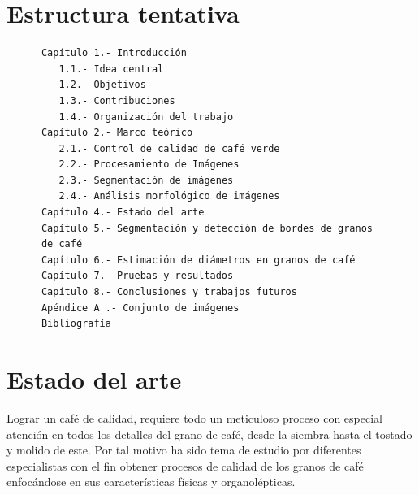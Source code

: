 \documentclass[12pt,a4paper,oneside]{book}
\begin{document}
\section{Estructura tentativa}
\begin{center}
\begin{verbatim}
      Capítulo 1.- Introducción
         1.1.- Idea central
         1.2.- Objetivos
         1.3.- Contribuciones
         1.4.- Organización del trabajo
      Capítulo 2.- Marco teórico
         2.1.- Control de calidad de café verde
         2.2.- Procesamiento de Imágenes
         2.3.- Segmentación de imágenes
         2.4.- Análisis morfológico de imágenes
      Capítulo 4.- Estado del arte
      Capítulo 5.- Segmentación y detección de bordes de granos
      de café
      Capítulo 6.- Estimación de diámetros en granos de café
      Capítulo 7.- Pruebas y resultados
      Capítulo 8.- Conclusiones y trabajos futuros
      Apéndice A .- Conjunto de imágenes 
      Bibliografía
\end{verbatim}
\end{center}

\section{Estado del arte}
Lograr un café de calidad, requiere todo un meticuloso proceso con especial atención en todos los detalles del grano de café, desde la siembra hasta el tostado y molido de este. Por tal motivo ha sido tema de estudio por diferentes especialistas con el fin obtener procesos de calidad de los granos de café enfocándose en sus características físicas y organolépticas.
\end{document}
